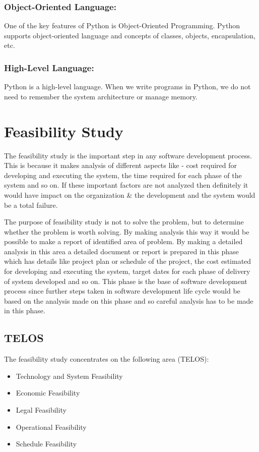 \documentclass[12pt, a4paper]{report}
\begin{document}
    \subsubsection{Object-Oriented Language:}
    One of the key features of Python is Object-Oriented Programming. Python supports object-oriented language and concepts of classes, objects, encapsulation, etc.
    
    \subsubsection{High-Level Language:}
    Python is a high-level language. When we write programs in Python, we do not need to remember the system architecture or manage memory.
    
  \newpage
  \section{Feasibility Study}
   The feasibility study is the important step in any software development process. This is because it makes analysis of different aspects like - cost required for developing and executing the system, the time required for each phase of the system and so on. If these important factors are not analyzed then definitely it would have impact on the organization & the development and the system would be a total failure.

  The purpose of feasibility study is not to solve the problem, but to determine whether the problem is worth solving. By making analysis this way it would be possible to make a report of identified area of problem. By making a detailed analysis in this area a detailed document or report is prepared in this phase which has details like project plan or schedule of the project, the cost estimated for developing and executing the system, target dates for each phase of delivery of system developed and so on. This phase is the base of software development process since further steps taken in software development life cycle would be based on the analysis made on this phase and so careful analysis has to be made in this phase.
  
  \subsection*{TELOS}
  
    The feasibility study concentrates on the following area (TELOS):
    \begin{itemize}
      \item Technology and System Feasibility
      \item Economic Feasibility
      \item Legal Feasibility
      \item Operational Feasibility
      \item Schedule Feasibility
    \end{itemize}
  
\end{document}
